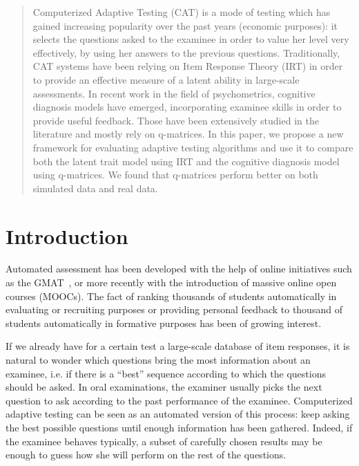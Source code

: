 \documentclass{sig-alternate}
\begin{document}
\maketitle
\begin{abstract}
Computerized Adaptive Testing (CAT) is a mode of testing which has gained increasing popularity over the past years (economic purposes): it selects the questions asked to the examinee in order to value her level very effectively, by using her answers to the previous questions.
Traditionally, CAT systems have been relying on Item Response Theory (IRT) in order to provide an effective measure of a latent ability in large-scale assessments.
In recent work in the field of psychometrics, cognitive diagnosis models have emerged, incorporating examinee skills in order to provide useful feedback. Those have been extensively studied in the literature and mostly rely on q-matrices.
In this paper, we propose a new framework for evaluating adaptive testing algorithms and use it to compare both the latent trait model using IRT and the cognitive diagnosis model using q-matrices.
We found that q-matrices perform better on both simulated data and real data.
\end{abstract}




\section{Introduction}
Automated assessment has been developed with the help of online initiatives such as the GMAT~\cite{Machin}, or more recently with the introduction of massive online open courses (MOOCs). The fact of ranking thousands of students automatically in evaluating or recruiting purposes or providing personal feedback to thousand of students automatically in formative purposes has been of growing interest.

If we already have for a certain test a large-scale database of item responses, it is natural to wonder which questions bring the most information about an examinee, i.e. if there is a ``best'' sequence according to which the questions should be asked. In oral examinations, the examiner usually picks the next question to ask according to the past performance of the examinee. Computerized adaptive testing can be seen as an automated version of this process: keep asking the best possible questions until enough information has been gathered. Indeed, if the examinee behaves typically, a subset of carefully chosen results may be enough to guess how she will perform on the rest of the questions.
\end{document}
